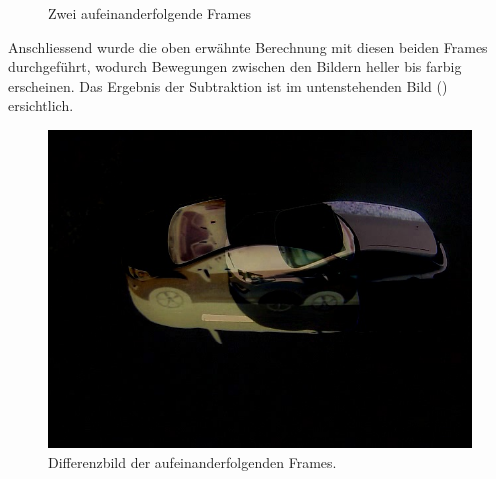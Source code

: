 \begin{figure}[H]
  \centering
  \caption{Zwei aufeinanderfolgende Frames}
  \label{bFrames}
\end{figure}

Anschliessend wurde die oben erwähnte Berechnung mit diesen beiden Frames durchgeführt, wodurch Bewegungen zwischen den Bildern heller bis farbig erscheinen. Das Ergebnis der Subtraktion ist im untenstehenden Bild () ersichtlich.

\begin{figure}[H]
  \centering
  \includegraphics[height=0.3\textheight]{Software/Blur1.jpg} 
  \caption{Differenzbild der aufeinanderfolgenden Frames.}
  \label{bBlur1}
\end{figure} 

